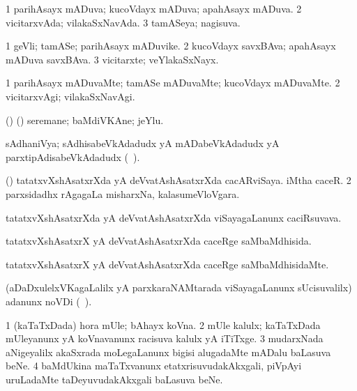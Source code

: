 \bentry
{}
\gl{\gu}
\bmng
\bnum
\num{1} parihAsayx mADuva; kucoVdayx mADuva; apahAsayx mADuva. 
\num{2} vicitarxvAda; vilakaSxNavAda. 
\num{3} tamASeya; nagisuva. 
\enum
\emng
\eentry

\bentry
{}
\gl{\nA}
\bmng
\bnum
\num{1} geVli; tamASe; parihAsayx mADuvike. 
\num{2} kucoVdayx savxBAva; apahAsayx mADuva savxBAva. 
\num{3} vicitarxte; veYlakaSxNayx. 
\enum
\emng
\eentry

\bentry
{}
\gl{\kirxvi}
\bmng
\bnum
\num{1} parihAsayx mADuvaMte; tamASe mADuvaMte; kucoVdayx mADuvaMte. 
\num{2} vicitarxvAgi; vilakaSxNavAgi. 
\enum
\emng
\eentry

\bentry
{}
\gl{\nA}
\bmng
(\birx) (\ashi) seremane; baMdiVKAne; jeYlu. 
\emng
\eentry

\bentry
{}
\gl{\nA}
\expl{\Latin}
\bmng
sAdhaniVya; sAdhisabeVkAdadudx yA mADabeVkAdadudx yA parxtipAdisabeVkAdadudx (\saMkiSx\ ). 
\emng
\eentry

\bentry
{}
\gl{\nA}
\bmng
\bnum
{} (\ca) 
\banum
{} tatatxvXshAsatxrXda yA deVvatAshAsatxrXda cacARviSaya. 
 iMtha caceR. 
\eanum
\numie
\num{2} parxsidadhx rAgagaLa misharxNa, kalasumeVloVgara. 
\enum
\emng
\eentry

\bentry
{}
\gl{\nA}
\bmng
tatatxvXshAsatxrXda yA deVvatAshAsatxrXda viSayagaLanunx caciRsuvava. 
\emng
\eentry

\bentry
{}
\gl{\gu}
\bmng
tatatxvXshAsatxrX yA deVvatAshAsatxrXda caceRge saMbaMdhisida. 
\emng
\eentry

\bentry
{}
\gl{\kirxvi}
\bmng
tatatxvXshAsatxrX yA deVvatAshAsatxrXda caceRge saMbaMdhisidaMte. 
\emng
\eentry

\bentry
{}
\gl{\pagu}
\expl{\Latin}
\bmng
(aDaDxulelxVKagaLalilx yA parxkaraNAMtarada viSayagaLanunx sUcisuvalilx) adanunx noVDi (\saMkiSx\ ). 
\emng
\eentry

\bentry
{}
\gl{\nA}
\bmng
\bnum
\num{1} (kaTaTxDada) hora mUle; bAhayx koVna. 
\num{2} mUle kalulx; kaTaTxDada mUleyanunx yA koVnavanunx racisuva kalulx yA iTiTxge.  
\num{3} mudarxNada aNigeyalilx akaSxrada moLegaLanunx bigisi alugadaMte mADalu baLasuva beNe. 
\num{4} baMdUkina maTaTxvanunx etatxrisuvudakAkxgali, piVpAyi uruLadaMte taDeyuvudakAkxgali baLasuva beNe. 
\enum
\emng
\eentry

